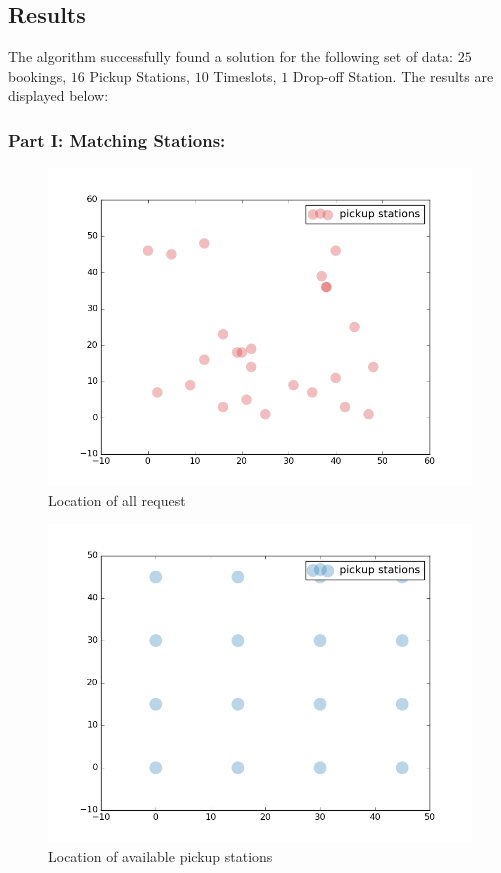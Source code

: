 \documentclass{article}
\begin{document}
\subsection{Results}
The algorithm successfully found a solution for the following set of data:
$25$ bookings, $16$ Pickup Stations, $10$ Timeslots, $1$ Drop-off Station. The results are displayed below:

\subsubsection*{Part I: Matching Stations: }
\begin{figure}[H]
    \centering 
  \includegraphics[width=0.7\linewidth]{pictures/results/Example1}
  \caption{Location of all request}
\label{fig:requests}
\end{figure}

\begin{figure}[H]
    \centering 
  \includegraphics[width=0.7\linewidth]{pictures/results/Example1_2}
  \caption{Location of available pickup stations}
\label{fig:stations_av}
\end{figure}
\end{document}
